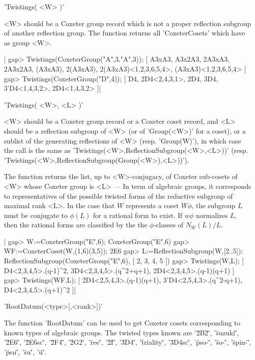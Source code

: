 'Twistings( <W> )'

<W>  should be  a Coxeter  group record  which is  not a  proper reflection
subgroup   of   another   reflection   group.   The  function  returns  all
'CoxeterCosets' which have as group <W>.

|    gap> Twistings(CoxeterGroup("A",3,"A",3));
    [ A3xA3, A3x2A3, 2A3xA3, 2A3x2A3, (A3xA3), 2(A3xA3), 
      2(A3xA3)<1,2,3,6,5,4>, (A3xA3)<1,2,3,6,5,4> ]
    gap> Twistings(CoxeterGroup("D",4));      
    [ D4, 2D4<2,4,3,1>, 2D4, 3D4, 3'D4<1,4,3,2>, 2D4<1,4,3,2> ]|

'Twistings( <W>, <L> )'

<W>  should be a  Coxeter group record  or a Coxeter  coset record, and <L>
should be a reflection subgroup of <W> (or of 'Group(<W>)' for a coset), or
a sublist of the generating reflections of <W> (resp. 'Group(W)'), in which
case  the call is  the same as 'Twistings(<W>,ReflectionSubgroup(<W>,<L>))'
(resp.  'Twistings(<W>,ReflectionSubgroup(Group(<W>),<L>))').

The  function returns the list, up  to <W>-conjugacy, of Coxeter sub-cosets
of  <W> whose  Coxeter group  is <L>  --- In  term of  algebraic groups, it
corresponds  to  representatives  of  the  possible  twisted  forms  of the
reductive  subgroup of maximal rank <L>. In  the case that $W$ represents a
coset  $W\phi$,  the  subgroup  $L$  must  be  conjugate to $\phi(L)$ for a
rational  form to exist. If $w\phi$ normalizes $L$, then the rational forms
are classified by the the $\phi$-classes of $N_W(L)/L$.

|    gap> W:=CoxeterGroup("E",6);
    CoxeterGroup("E",6)
    gap> WF:=CoxeterCoset(W,(1,6)(3,5));
    2E6
    gap> L:=ReflectionSubgroup(W,[2..5]);
    ReflectionSubgroup(CoxeterGroup("E",6), [ 2, 3, 4, 5 ])
    gap> Twistings(W,L);
    [ D4<2,3,4,5>.(q-1)^2, 3D4<2,3,4,5>.(q^2+q+1),
      2D4<2,3,4,5>.(q-1)(q+1) ]
    gap> Twistings(WF,L);
    [ 2D4<2,5,4,3>.(q-1)(q+1), 3'D4<2,5,4,3>.(q^2-q+1),
      D4<2,3,4,5>.(q+1)^2 ]|


'RootDatum(<type>[,<rank>])'

The function 'RootDatum' can be used to get Coxeter cosets corresponding to
known  types of  algebraic groups.  The twisted  types known are '\"2B2\"',
'\"suzuki\"',  '\"2E6\"',  '\"2E6sc\"',  '\"2F4\"',  '\"2G2\"',  '\"ree\"',
'\"2I\"',  '\"3D4\"',  '\"triality\"',  '\"3D4sc\"', '\"pso-\"', '\"so-\"',
'\"spin-\"', '\"psu\"', '\"su\"', '\"u\"'.

